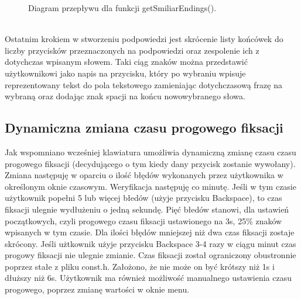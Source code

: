 \documentclass[twoside,a4paper]{book}
\begin{document}
				\begin{figure}[!h]
		\centering
		\caption{Diagram przepływu dla funkcji getSmiliarEndings().}
		\label{fig:similarEndingsFlow}
		\end{figure}\\
Ostatnim krokiem w stworzeniu podpowiedzi jest skrócenie listy końcówek do liczby przycisków przeznaczonych na podpowiedzi oraz zespolenie ich z dotychczas wpisanym słowem. Taki ciąg znaków można przedstawić użytkownikowi jako napis na przycisku, który po wybraniu wpisuje reprezentowany tekst do pola tekstowego zamieniając dotychczasową frazę na wybraną oraz dodając znak spacji na końcu nowowybranego słowa.
\subsection{Dynamiczna zmiana czasu progowego fiksacji}\label{sec:dynamic}
Jak wspomniano wcześniej klawiatura umożliwia dynamiczną zmianę czasu czasu progowego fiksacji (decydującego o tym kiedy dany przycisk zostanie wywołany). Zmiana następuję w oparciu o ilość błędów wykonanych przez użytkownika w określonym oknie czasowym. Weryfikacja następuję co minutę. Jeśli w tym czasie użytkownik popełni 5 lub więcej błedów (użyje przycisku Backspace), to czas fiksacji ulegnie wydłużeniu o jedną sekundę. Pięć błedów stanowi, dla ustawień początkowych, czyli progowego czasu fiksacji ustawionego na 3s, 25\% znaków wpisanych w tym czasie. Dla ilości błędów mniejszej niż dwa czas fiksacji zostaje skrócony. Jeśli użtkownik użyje przycisku Backspace 3-4 razy w ciągu minut czas progowy fiksacji nie ulegnie zmianie. Czas fiksacji został ograniczony obu\-stro\-nnie poprzez stałe z pliku const.h. Założono, że nie może on być krótszy niż 1s i dłuższy niż 6s. Użytkownik ma również możliwość manualnego ustawienia czasu progowego, poprzez zmianę wartości w oknie menu.  
\end{document}
